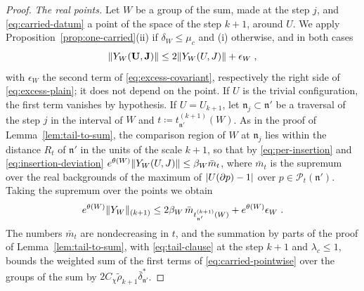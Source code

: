 \documentclass[11pt]{preprint}
\DeclarePairedDelimiter{\abs}{\lvert}{\rvert}
\DeclarePairedDelimiter{\norm}{\lVert}{\rVert}
\numberwithin{equation}{section}
\theoremstyle{definition}
\theoremstyle{remark}
\theoremstyle{plain}
\begin{document}
\begin{proof}
\emph{The real points.} Let $W$ be a group of the sum, made at the step $j$, and \eqref{eq:carried-datum} a point of the space of the step $k + 1$, around $U$. We apply Proposition~\ref{prop:one-carried}(ii) if $\delta_W \leq \mu_c$ and (i) otherwise, and in both cases
\[
    \norm{Y_W(\mathbf U, \mathbf J)} \leq 2\norm{Y_W(U, J)} + \epsilon_W\;,
\]
with $\epsilon_W$ the second term of \eqref{eq:excess-covariant}, respectively the right side of \eqref{eq:excess-plain}; it does not depend on the point. If $U$ is the trivial configuration, the first term vanishes by hypothesis. If $U = U_{k+1}$, let $\mathfrak n_j \subset \mathfrak n'$ be a traversal of the step $j$ in the interval of $W$ and $t \coloneqq t^{(k+1)}_{\mathfrak n'}(W)$. As in the proof of Lemma~\ref{lem:tail-to-sum}, the comparison region of $W$ at $\mathfrak n_j$ lies within the distance $R_t$ of $\mathfrak n'$ in the units of the scale $k + 1$, so that by \eqref{eq:per-insertion} and \eqref{eq:insertion-deviation} $e^{\theta(W)}\norm{Y_W(U, J)} \leq \beta_W\bar m_t$, where $\bar m_t$ is the supremum over the real backgrounds of the maximum of $\abs{U(\partial p) - 1}$ over $p \in \mathcal P_t(\mathfrak n')$. Taking the supremum over the points we obtain
\begin{equation}\label{eq:carried-pointwise}
    e^{\theta(W)}\norm{Y_W}_{(k+1)} \leq 2\beta_W\,\bar m_{t^{(k+1)}_{\mathfrak n'}(W)} + e^{\theta(W)}\epsilon_W\;.
\end{equation}
The numbers $\bar m_t$ are nondecreasing in $t$, and the summation by parts of the proof of Lemma~\ref{lem:tail-to-sum}, with \eqref{eq:tail-clause} at the step $k + 1$ and $\lambda_c \leq 1$, bounds the weighted sum of the first terms of \eqref{eq:carried-pointwise} over the groups of the sum by $2C_\chi\tilde\rho_{k+1}\bar\delta^*_{\mathfrak n'}$.


\end{proof}
\end{document}
